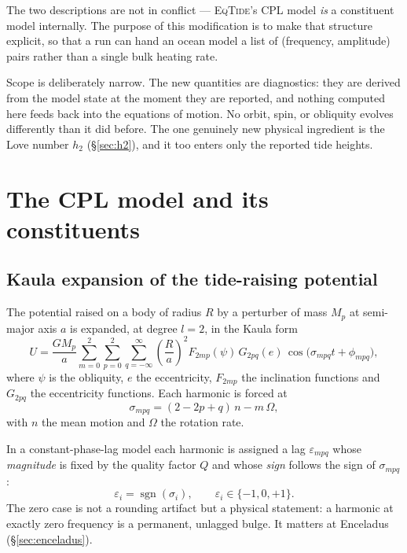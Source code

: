 \documentclass[11pt]{article}
\newcommand{\eqtide}{\textsc{EqTide}}
\newcommand{\Om}{\Omega}
\begin{document}
The two descriptions are not in conflict --- \eqtide's CPL model \emph{is} a
constituent model internally. The purpose of this modification is to make that
structure explicit, so that a run can hand an ocean model a list of
(frequency, amplitude) pairs rather than a single bulk heating rate.

Scope is deliberately narrow. The new quantities are diagnostics: they are
derived from the model state at the moment they are reported, and nothing
computed here feeds back into the equations of motion. No orbit, spin, or
obliquity evolves differently than it did before. The one genuinely new
physical ingredient is the Love number $h_2$ (\S\ref{sec:h2}), and it too
enters only the reported tide heights.

\section{The CPL model and its constituents}

\subsection{Kaula expansion of the tide-raising potential}

The potential raised on a body of radius $R$ by a perturber of mass $M_p$ at
semi-major axis $a$ is expanded, at degree $l=2$, in the Kaula form
\begin{equation}
  U = \frac{GM_p}{a}\sum_{m=0}^{2}\sum_{p=0}^{2}\sum_{q=-\infty}^{\infty}
  \left(\frac{R}{a}\right)^{2} F_{2mp}(\psi)\,G_{2pq}(e)\,
  \cos\!\big(\sigma_{mpq}t + \phi_{mpq}\big),
\end{equation}
where $\psi$ is the obliquity, $e$ the eccentricity, $F_{2mp}$ the inclination
functions and $G_{2pq}$ the eccentricity functions. Each harmonic is forced at
\begin{equation}
  \sigma_{mpq} = (2-2p+q)\,n - m\,\Om ,
  \label{eq:sigma}
\end{equation}
with $n$ the mean motion and $\Om$ the rotation rate.

In a constant-phase-lag model each harmonic is assigned a lag
$\varepsilon_{mpq}$ whose \emph{magnitude} is fixed by the quality factor $Q$
and whose \emph{sign} follows the sign of $\sigma_{mpq}$:
\begin{equation}
  \varepsilon_i = \operatorname{sgn}(\sigma_i),
  \qquad
  \varepsilon_i \in \{-1,0,+1\}.
  \label{eq:eps}
\end{equation}
The zero case is not a rounding artifact but a physical statement: a harmonic
at exactly zero frequency is a permanent, unlagged bulge. It matters at
Enceladus (\S\ref{sec:enceladus}).
\end{document}
